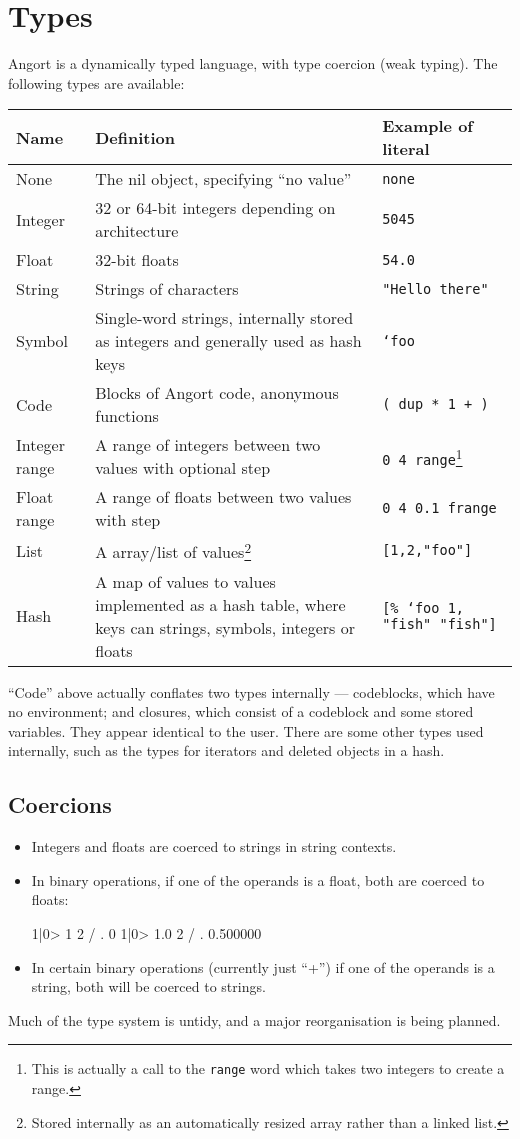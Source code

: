 \section{Types}
Angort is a dynamically typed language, with type coercion (weak typing).
The following types are available:
\begin{center}
\begin{tabular}{|l|p{2.7in}|l|}\hline
\textbf{Name} & \textbf{Definition} & \textbf{Example of literal} \\ \hline
None & The nil object, specifying ``no value'' & \texttt{none} \\
Integer & 32 or 64-bit integers depending on architecture & \texttt{5045} \\
Float & 32-bit floats & \texttt{54.0} \\
String & Strings of characters & \texttt{"Hello there"} \\
Symbol & Single-word strings, internally stored as integers and
generally used as hash keys & \texttt{`foo} \\
Code& Blocks of Angort code, anonymous functions & \texttt{( dup * 1 + )}\\
Integer range & A range of integers between two values with optional step& \texttt{0 4 range}\footnote{This is actually a call to the \texttt{range} word which takes two integers to create a range.}\\
Float range & A range of floats between two values with  step& \texttt{0 4 0.1 frange}\\
List & A array/list of values\footnote{Stored internally as an
automatically resized array rather than a linked list.} & \texttt{[1,2,"foo"]} \\
Hash & A map of values to values implemented as a hash table, where
keys can strings, symbols, integers or floats & \texttt{[\% `foo 1, "fish" "fish"]} \\
\hline
\end{tabular}
\end{center}
``Code'' above actually conflates two types internally --- codeblocks,
which have no environment; and closures, which consist of a codeblock and
some stored variables. They appear identical to the user.
There are some other types used internally, such as the
types for iterators and deleted objects in a hash.
\clearpage
\subsection{Coercions}
\begin{itemize}
\item Integers and floats are coerced to strings in string contexts.
\item In binary operations, if one of the operands is a float, both are coerced to floats:
\begin{v}
1|0> 1 2 / .
0
1|0> 1.0 2 / .
0.500000
\end{v}
\item In certain binary operations (currently just ``+'') if one of the operands
is a string, both will be coerced to strings.
\end{itemize}
Much of the type system is untidy, and a major reorganisation is being
planned.
\clearpage

